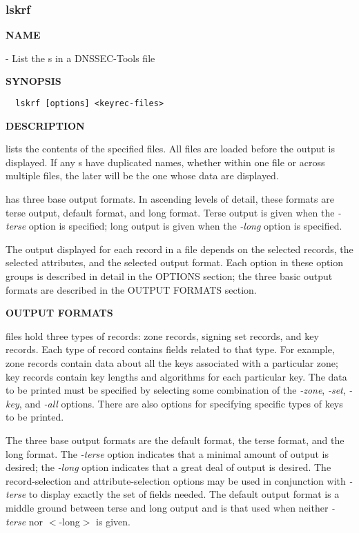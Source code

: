 \clearpage

\subsubsection{lskrf}

{\bf NAME}

 - List the s in a DNSSEC-Tools  file

{\bf SYNOPSIS}

\begin{verbatim}
  lskrf [options] <keyrec-files>
\end{verbatim}

{\bf DESCRIPTION}

 lists the contents of the specified  files.  All
 files are loaded before the output is displayed.  If any
s have duplicated names, whether within one file or across
multiple files, the later  will be the one whose data are
displayed.

 has three base output formats.  In ascending levels of detail,
these formats are terse output, default format, and long format.  Terse output
is given when the {\it -terse} option is specified; long output is given when
the {\it -long} option is specified.

The output displayed for each record in a  file depends on the
selected records, the selected attributes, and the selected output format.
Each option in these option groups is described in detail in the OPTIONS
section; the three basic output formats are described in the OUTPUT FORMATS
section.

{\bf OUTPUT FORMATS}

 files hold three types of  records:  zone
records, signing set records, and key records.  Each type of 
record contains  fields related to that type.  For example,
zone  records contain data about all the keys associated with a
particular zone; key  records contain key lengths and
algorithms for each particular key.  The data to be printed must be specified
by selecting some combination of the {\it -zone}, {\it -set}, {\it -key}, and
{\it -all} options.  There are also options for specifying specific types of
keys to be printed.

The three base output formats are the default format, the terse format, and
the long format.  The {\it -terse} option indicates that a minimal amount of
output is desired; the {\it -long} option indicates that a great deal of
output is desired.  The record-selection and attribute-selection options may
be used in conjunction with {\it -terse} to display exactly the set of
 fields needed.  The default output format is a middle ground
between terse and long output and is that used when neither {\it -terse} nor
$<$-long$>$ is given.

